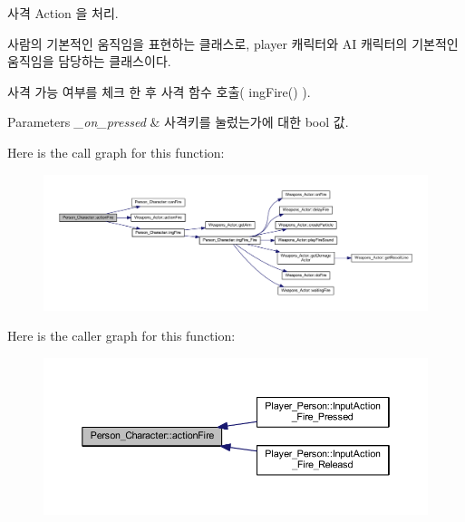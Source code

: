 사격 Action 을 처리. 

사람의 기본적인 움직임을 표현하는 클래스로, player 캐릭터와 AI 캐릭터의 기본적인 움직임을 담당하는 클래스이다.

사격 가능 여부를 체크 한 후 사격 함수 호출( ing\+Fire() ). 
\begin{DoxyParams}{Parameters}
{\em \+\_\+on\+\_\+pressed} & 사격키를 눌렀는가에 대한 bool 값. \\
\hline
\end{DoxyParams}


Here is the call graph for this function\+:\nopagebreak
\begin{figure}[H]
\begin{center}
\leavevmode
\includegraphics[width=350pt]{class_person___character_a37cd54aead0c3783a6a0e47382606216_cgraph}
\end{center}
\end{figure}




Here is the caller graph for this function\+:\nopagebreak
\begin{figure}[H]
\begin{center}
\leavevmode
\includegraphics[width=350pt]{class_person___character_a37cd54aead0c3783a6a0e47382606216_icgraph}
\end{center}
\end{figure}


